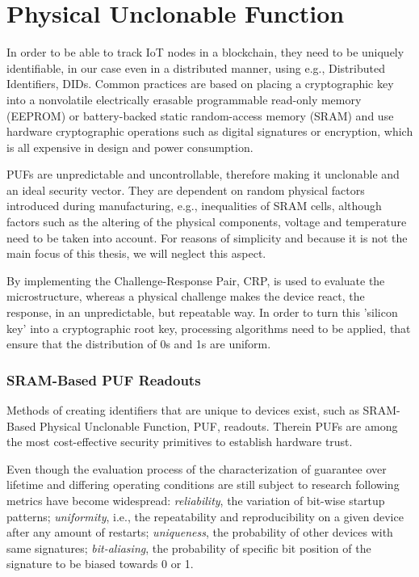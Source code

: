 \section{Physical Unclonable Function} %
\label{sec:Physical Unclonable Function}

In order to be able to track IoT nodes in a blockchain, they need to be uniquely identifiable, in our case even in a
distributed manner, using e.g., Distributed Identifiers, DIDs.
Common practices are based on placing a cryptographic key into a nonvolatile electrically erasable programmable
read-only memory (EEPROM) or battery-backed static random-access memory (SRAM) and use hardware cryptographic operations
such as digital signatures or encryption, which is all expensive in design and power consumption. \cite{herder2014physical}

PUFs are unpredictable and uncontrollable, therefore making it unclonable and an ideal security vector. They are
dependent on random physical factors introduced during manufacturing, e.g., inequalities of SRAM cells, although factors
such as the altering of the physical components, voltage and temperature need to be taken into account. \cite{vinagrero2023sram}
For reasons of simplicity and because it is not the main focus of this thesis, we will neglect this aspect.

By implementing the Challenge-Response Pair, CRP, is used to evaluate the microstructure, whereas a physical challenge
makes the device react, the response, in an unpredictable, but repeatable way.
In order to turn this 'silicon key' into a cryptographic root key, processing algorithms need to be applied, that ensure
that the distribution of 0s and 1s are uniform. \cite{herder2014physical}

\subsubsection{SRAM-Based PUF Readouts} %
\label{sec:SRAM-Based PUF Readouts}

Methods of creating identifiers that are unique to devices exist, such as SRAM-Based Physical Unclonable Function, PUF,
readouts. Therein PUFs are among the most cost-effective security primitives to establish hardware trust.
\cite{holcomb2007initial}

Even though the evaluation process of the characterization of guarantee over lifetime and differing operating conditions
are still subject to research following metrics have become widespread: \textit{reliability}, the variation of bit-wise
startup patterns; \textit{uniformity}, i.e., the repeatability and reproducibility on a given device after any amount of
restarts; \textit{uniqueness}, the probability of other devices with same signatures; \textit{bit-aliasing}, the
probability of specific bit position of the signature to be biased towards 0 or 1. \cite{vinagrero2023sram}

